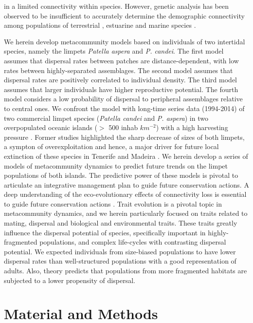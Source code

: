 \documentclass[12pt]{article}
\begin{document}
\begin{justify}
{{{{{in a limited connectivity within species. However, genetic analysis has been observed to be insufficient to accurately determine the demographic connectivity among populations of terrestrial \citep{chapuis2011challenges}, estuarine \citep{turner2002genetic} and marine species \citep{hawkins2016fisheries}.

We herein develop metacommunity models based on individuals of two intertidal species, namely the limpets \textit{Patella aspera} and \textit{P. candei}. The first model assumes that dispersal rates between patches are distance-dependent, with low rates between highly-separated assemblages. The second model assumes that dispersal rates are positively correlated to individual density. The third model assumes that larger individuals have higher reproductive potential. The fourth model considers a low probability of dispersal to peripheral assemblages relative to central ones. We confront the model with long-time series data (1994-2014) of two commercial limpet species (\textit{Patella candei} and \textit{P. aspera}) in two overpopulated oceanic islands ($>$ 500 inhab $km^{-2}$) with a high harvesting pressure \citep{riera2016clear, sousa2019long}. Former studies highlighted the sharp decrease of sizes of both limpets, a sympton of overexploitation and hence, a major driver for future local extinction of these species in Tenerife \citep{riera2016clear} and Madeira \citep{sousa2019long}. We herein develop a series of models of metacommunity dynamics to predict future trends on the limpet populations of both islands. The predictive power of these models is pivotal to articulate an integrative management plan to guide future conservation actions. A deep understanding of the eco-evolutionary effects of connectivity loss is essential to guide future conservation actions \citep{travis2013dispersal, urban2001landscape}. Trait evolution is a pivotal topic in metacommunity dynamics, and we herein particularly focused on traits related to mating, dispersal and biological and environmental traits. These traits greatly influence the dispersal potential of species, specifically important in highly-fragmented populations, and complex life-cycles with contrasting dispersal potential.
We expected individuals from size-biased populations to have lower dispersal rates than well-structured populations with a good representation of adults. Also, theory predicts that populations from more fragmented habitats are subjected to a lower propensity of dispersal.

\section{Material and Methods}
}}}}}
\end{justify}
\end{document}
